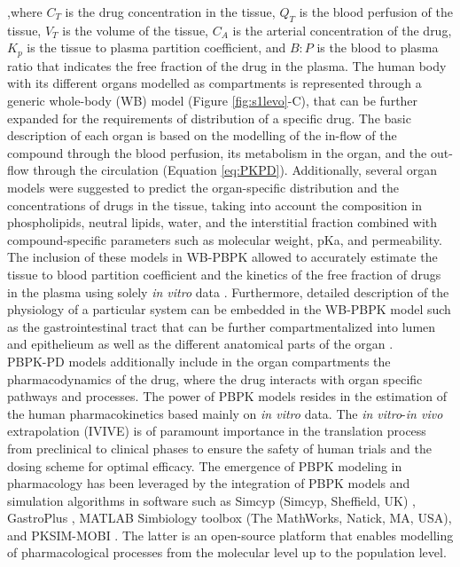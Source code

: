 ,where $C_{T}$ is the drug concentration in the tissue, $Q_{T}$ is the blood perfusion of the tissue, $V_{T}$ is the volume of the tissue, $C_{A}$ is the arterial concentration of the drug, $K_{p}$ is the tissue to plasma partition coefficient, and $B:P$ is the blood to plasma ratio that indicates the free fraction of the drug in the plasma. The human body with its different organs modelled as compartments is represented through a generic whole-body (WB) model  \cite{peters2008evaluation} (Figure \ref{fig:s1levo}-C), that can be further expanded for the requirements of distribution of a specific drug. The basic description of each organ is based on the modelling of the in-flow of the compound through the blood perfusion, its metabolism in the organ, and the out-flow through the circulation (Equation \ref{eq:PKPD}). Additionally, several organ models \cite{poulin2002prediction,poulin2000priori,poulin2001prediction} were suggested to predict the organ-specific distribution and the concentrations of drugs in the tissue, taking into account the composition in phospholipids, neutral lipids, water, and the interstitial fraction combined with compound-specific parameters such as molecular weight, pKa, and permeability. The inclusion of these models in WB-PBPK allowed to accurately estimate the tissue to blood partition coefficient and the kinetics of the free fraction of drugs in the plasma using solely \textit{in vitro} data \cite{rodgers2006physiologically,rodgers2005physiologically,poulin2015paradigm}.
Furthermore, detailed description of the physiology of a particular system can be embedded in the WB-PBPK model such as the gastrointestinal tract that can be further compartmentalized into lumen and epithelieum as well as the different anatomical parts of the organ \cite{ando2015new,cong2000new}.\\
PBPK-PD models \cite{kuepfer2016applied} additionally include in the organ compartments the pharmacodynamics of the drug, where the drug interacts with organ specific pathways and processes. The power of PBPK models resides in the estimation of the human pharmacokinetics based mainly on \textit{in vitro} data. The \textit{in vitro}-\textit{in vivo} extrapolation (IVIVE) \cite{yeo2013application} is of paramount importance in the translation process from preclinical to clinical phases to ensure the safety of human trials \cite{lippert2012mechanistic,thiel2017comparative} and the dosing scheme for optimal efficacy. The emergence of PBPK modeling in pharmacology has been leveraged by the integration of PBPK models and simulation algorithms in software such as Simcyp (Simcyp, Sheffield, UK) , GastroPlus \cite{agoram2001predicting}, MATLAB Simbiology toolbox (The MathWorks, Natick, MA, USA), and PKSIM-MOBI \cite{eissing2011computational}. The latter is an open-source platform that enables modelling of pharmacological processes from the molecular level up to the population level.\\
